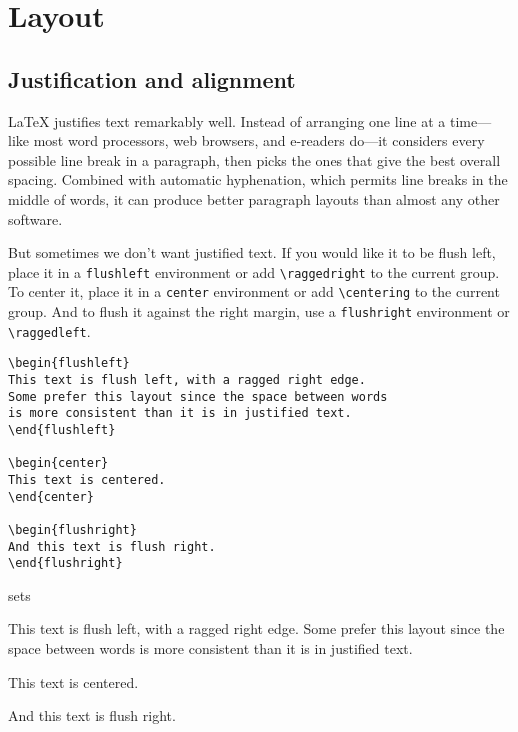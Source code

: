 \chapter{Layout}

\section{Justification and alignment}

\LaTeX{} justifies text remarkably well.
Instead of arranging one line at a time---like most word processors,
web browsers, and e-readers do---it considers every possible line break
in a paragraph, then picks the ones that give the best overall
spacing.\punckern{}
Combined with automatic hyphenation,
which permits line breaks in the middle of words,\punckern{}
it can produce better paragraph layouts than almost any other software.

But sometimes we don't want justified text.
If you would like it to be flush left,
place it in a \texttt{flushleft} environment
or add \verb|\raggedright| to the current group.
To center it, place it in a
\texttt{center} environment or add \verb|\centering| to the current group.
And to flush it against the right margin,
use a \texttt{flushright} environment or \verb|\raggedleft|.

\begin{leftfigure}
\begin{lstlisting}
\begin{flushleft}
This text is flush left, with a ragged right edge.
Some prefer this layout since the space between words
is more consistent than it is in justified text.
\end{flushleft}

\begin{center}
This text is centered.
\end{center}

\begin{flushright}
And this text is flush right.
\end{flushright}
\end{lstlisting}
\end{leftfigure}
sets
\begin{flushleftfigure}
\begin{minipage}{0.99\textwidth}
\lm%
\begin{flushleft}
This text is flush left, with a ragged right edge.
Some prefer this layout since the space between words
is more consistent than it is in justified text.
\end{flushleft}

\begin{center}
This text is centered.
\end{center}

\begin{flushright}
And this text is flush right.
\end{flushright}
\end{minipage}
\end{flushleftfigure}

